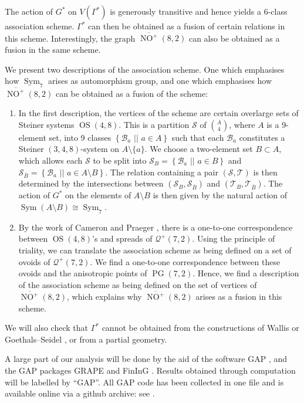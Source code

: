 \documentclass[a4paper]{article}
\theoremstyle{definition}
\newcommand{\sett}[2]{ \left\{ #1 \, \, || \, \, #2 \right \} }
\newcommand{\mb}{\mathcal B}
\newcommand{\mq}{\mathcal Q}
\newcommand{\ms}{\mathcal S}
\newcommand{\mt}{\mathcal T}
\DeclareMathOperator{\PG}{PG}
\newcommand{\pg}{\PG}
\DeclareMathOperator{\NO}{NO}
\newcommand{\nono}{\overline{\NO^+}(8,2)}
\DeclareMathOperator{\Sym}{Sym}
\DeclareMathOperator{\OS}{OS}
\begin{document}
The action of $G^*$ on $V(\Gamma^*)$ is generously transitive and hence yields a $6$-class association scheme.
$\Gamma^*$ can then be obtained as a fusion of certain relations in this scheme.
Interestingly, the graph $\nono$ can also be obtained as a fusion in the same scheme.

We present two descriptions of the association scheme.
One which emphasises how $\Sym_7$ arises as automorphism group, and one which emphasises how $\nono$ can be obtained as a fusion of the scheme:
\begin{enumerate}
 \item In the first description, the vertices of the scheme are certain overlarge sets of Steiner systems $\OS(4,8)$.
 This is a partition $\ms$ of $\binom A 4$, where $A$ is a 9-element set, into 9 classes $\sett{\mb_a}{a \in A}$ such that each $\mb_a$ constitutes a Steiner $(3,4,8)$-system on $A \setminus \{a\}$.
 We choose a two-element set $B \subset A$, which allows each $\ms$ to be split into $\ms_B = \sett{\mb_a}{a \in B}$ and $\ms_{\overline B} = \sett{\mb_a}{a \in A \setminus B}$.
 The relation containing a pair $(\ms,\mt)$ is then determined by the intersections between $(\ms_B, \ms_{\overline B})$ and $(\mt_B, \mt_{\overline B})$.
 The action of $G^*$ on the elements of $A \setminus B$ is then given by the natural action of $\Sym(A \setminus B) \cong \Sym_7$.
 \item By the work of Cameron and Praeger \cite{Cameron:Praeger}, there is a one-to-one correspondence between $\OS(4,8)$'s and spreads of $\mq^+(7,2)$.
 Using the principle of triality, we can translate the association scheme as being defined on a set of ovoids of $\mq^+(7,2)$.
 We find a one-to-one correspondence between these ovoids and the anisotropic points of $\pg(7,2)$.
 Hence, we find a description of the association scheme as being defined on the set of vertices of $\nono$, which explains why $\nono$ arises as a fusion in this scheme.
\end{enumerate}

We will also check that $\Gamma^*$ cannot be obtained from the constructions of Wallis \cite{Wallis} or Goethals--Seidel \cite{Goethals:Seidel}, or from a partial geometry.

A large part of our analysis will be done by the aid of the software GAP \cite{GAP4}, and the GAP packages GRAPE \cite{GRAPE} and FinInG \cite{fining}.
Results obtained through computation will be labelled by ``GAP''. All GAP code has been collected in one file and is available online via a github archive: see \cite{ABDBRgap}.
\end{document}

